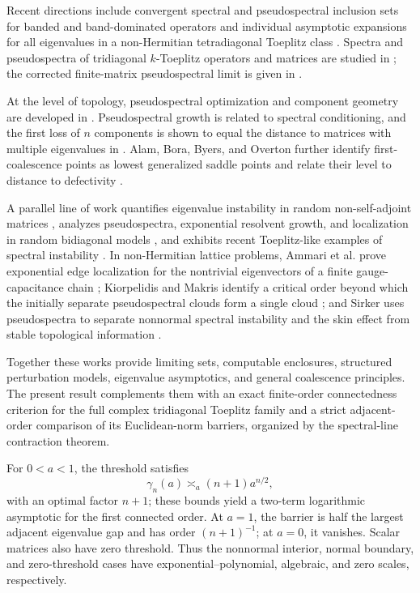 \documentclass[11pt,a4paper]{article}
\numberwithin{equation}{section}
\begin{document}
Recent directions include convergent spectral and pseudospectral inclusion
sets for banded and band-dominated operators \cite{ChandlerWildeEtAl2024}
and individual asymptotic expansions for all eigenvalues in a non-Hermitian
tetradiagonal Toeplitz class \cite{BogoyaGascaGrudsky2025}.  Spectra and
pseudospectra of tridiagonal \(k\)-Toeplitz operators and matrices are studied
in \cite{AmmariEtAl2025}; the corrected finite-matrix pseudospectral limit is
given in \cite{AmmariCorrigendum2026}.

At the level of topology, pseudospectral optimization and component geometry
are developed in \cite{BurkeLewisOverton2003}.  Pseudospectral growth is
related to spectral conditioning, and the first loss of \(n\) components is
shown to equal the distance to matrices with multiple eigenvalues in
\cite{BurkeLewisOverton2007}.  Alam, Bora, Byers, and Overton further identify
first-coalescence points as lowest generalized saddle points and relate their
level to distance to defectivity \cite{AlamEtAl2011}.

A parallel line of work quantifies eigenvalue instability in random
non-self-adjoint matrices \cite{Davies2001}, analyzes pseudospectra,
exponential resolvent growth, and localization in random bidiagonal models
\cite{TrefethenContediniEmbree2001}, and exhibits recent Toeplitz-like
examples of spectral instability \cite{Bottcher2024}.  In non-Hermitian
lattice problems, Ammari et al. prove exponential edge localization for the
nontrivial eigenvectors of a finite gauge-capacitance chain
\cite{AmmariEtAl2024}; Kiorpelidis and Makris
identify a critical order beyond which the initially separate
pseudospectral clouds form a single cloud \cite{KiorpelidisMakris2025}; and
Sirker uses pseudospectra to separate nonnormal spectral instability and the
skin effect from stable topological information \cite{Sirker2026}.

Together these works provide limiting sets, computable enclosures, structured
perturbation models, eigenvalue asymptotics, and general coalescence
principles.  The present result complements them with an exact finite-order
connectedness criterion for the full complex tridiagonal Toeplitz family and
a strict adjacent-order comparison of its Euclidean-norm barriers, organized
by the spectral-line contraction theorem.

For \(0<a<1\), the threshold satisfies
\begin{equation}\label{eq:intro-barrier-order}
 \gamma_n(a)\asymp_a(n+1)a^{n/2},
\end{equation}
with an optimal factor \(n+1\); these bounds yield a two-term logarithmic
asymptotic for the first connected order.  At \(a=1\), the barrier is half
the largest adjacent eigenvalue gap and has order \((n+1)^{-1}\); at \(a=0\),
it vanishes.  Scalar matrices also have zero threshold.  Thus the nonnormal
interior, normal boundary, and zero-threshold cases have
exponential--polynomial, algebraic, and zero scales, respectively.
\end{document}
